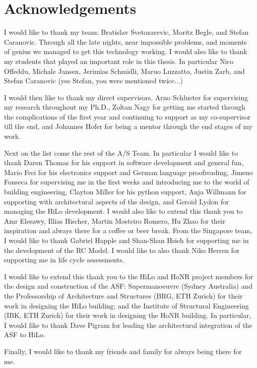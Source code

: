 
\bigskip

\begingroup
\let\clearpage\relax
\let\cleardoublepage\relax
\let\cleardoublepage\relax
\chapter*{Acknowledgements}

\def\thanks#1{%
\begingroup
\leftskip1em
\noindent #1
\par
\endgroup
}

I would like to thank my team: Bratislav Svetozarevic, Moritz Begle, and Stefan Caranovic. Through all the late nights, near impossible problems, and moments of genius we managed to get this technology working. I would also like to thank my students that played an important role in this thesis. In particular Nico Offeddu, Michale Jansen, Jerimias Schmidli, Maruo Luzzatto, Justin Zarb, and Stefan Caranovic (yes Stefan, you were mentioned twice...)

I would then like to thank my direct supervisors. Arno Schlueter for supervising my research throughout my Ph.D., Zoltan Nagy for getting me started through the complications of the first year and continuing to support as my co-supervisor till the end, and Johannes Hofer for being a mentor through the end stages of my work. 

Next on the list come the rest of the A/S Team. In particular I would like to thank Daren Thomas for his support in software development and general fun, Mario Frei for his electronics support and German language proofreading, Jimeno Fonseca for supervising me in the first weeks and introducing me to the world of building engineering, Clayton Miller for his python support, Anja Willmann for supporting with architectural aspects of the design, and Geroid Lydon for managing the HiLo development. I would also like to extend this thank you to Amr Elesawy, Illias Hischer, Martin Mosteiro Romero, Hu Zhao for their inspiration and always there for a coffee or beer break. From the Singapore team, I would like to thank Gabriel Happle and Shan-Shan Hsieh for supporting me in the development of the RC Model. I would like to also thank Niko Herren for supporting me in life cycle assessments. 

I would like to extend this thank you to the HiLo and HoNR project members for the design and construction of the ASF: Supermanoeuvre (Sydney Australia) and the Professorship of Architecture and Structures (BRG, ETH Zurich) for their work in designing the HiLo building; and the Institute of Structural Engineering (IBK, ETH Zurich) for their work in designing the HoNR building. In particular, I would like to thank Dave Pigram for leading the architectural integration of the ASF to HiLo.

Finally, I would like to thank my friends and family for always being there for me.



\endgroup
